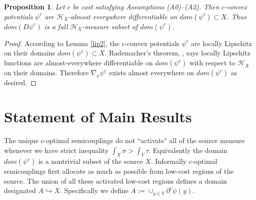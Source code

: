 \documentclass[12pt]{amsart}
\newtheorem{prop}{Proposition}
\theoremstyle{definition}
\theoremstyle{remark}
\newcommand{\del}{\partial}
\begin{document}




\begin{prop}\label{lip3} 
Let $c$ be cost satisfying Assumptions (A0)--(A2). Then $c$-convex potentials $\psi^c$ are $\mathscr{H}_X$-almost everywhere differentiable on $dom(\psi^c) \subset X$. Thus $dom(D \psi^c)$ is a full $\mathscr{H}_X$-measure subset of $dom(\psi^c)$.
\end{prop}
\begin{proof}
According to Lemma \ref{lip2}, the $c$-convex potentials $\psi^c$ are locally Lipschitz on their domains $dom(\psi^c) \subset X$. Rademacher's theorem, \cite[Thm 10.8, pp.222]{Vil1}, says locally Lipschitz functions are almost-everywhere differentiable on $dom(\psi^c)$ with respect to $\mathscr{H}_X$ on their domains. Therefore $\nabla_x \psi^c$ exists almost everywhere on $dom (\psi^c)$ as desired.
\end{proof}









\section{Statement of Main Results }
 The unique $c$-optimal semicouplings do not ``activate" all of the source measure whenever we have strict inequality $\int_X \sigma > \int_Y \tau$.  Equivalently the domain $dom(\psi^c)$ is a nontrivial subset of the source $X$. Informally $c$-optimal semicouplings first allocate as much as possible from low-cost regions of the source. The union of all these activated low-cost regions defines a domain designated $A \hookrightarrow X$. Specifically we define $A:=\cup_{y\in Y} \del^c \psi(y)$. 
\end{document}
